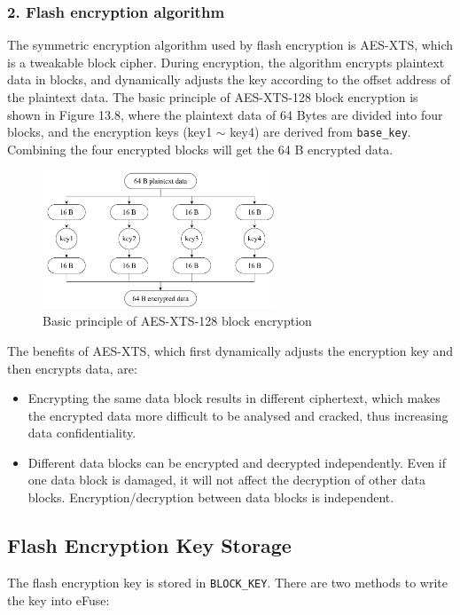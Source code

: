 \documentclass[a4paper,12pt,openany]{book}
\begin{document}
\subsubsection{2. Flash encryption algorithm}
The symmetric encryption algorithm used by flash encryption is AES-XTS, which is a tweakable block cipher. During encryption, the algorithm encrypts plaintext data in blocks, and dynamically adjusts the key according to the offset address of the plaintext data. The basic principle of AES-XTS-128 block encryption is shown in Figure 13.8, where the plaintext data of 64 Bytes are divided into four blocks, and the encryption keys (key1 $\sim$ key4) are derived from \verb|base_key|. Combining the four encrypted blocks will get the 64 B encrypted data.

\begin{figure}[!h]
    \centering
    \includegraphics[width=0.62\textwidth]{D13Z/13-8}
    \caption{Basic principle of AES-XTS-128 block encryption}
\end{figure}

The benefits of AES-XTS, which first dynamically adjusts the encryption key and then encrypts data, are: 

\begin{itemize}
    \item Encrypting the same data block results in different ciphertext, which makes the encrypted data more difficult to be analysed and cracked, thus increasing data confidentiality. 
    \item Different data blocks can be encrypted and decrypted independently. Even if one data block is damaged, it will not affect the decryption of other data blocks. Encryption/decryption between data blocks is independent.
\end{itemize}

\subsection{Flash Encryption Key Storage}
The flash encryption key is stored in \verb|BLOCK_KEY|. There are two methods to write the key into eFuse: 
\end{document}
